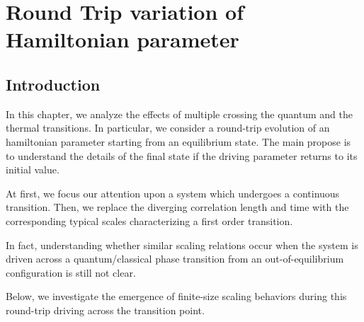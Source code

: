 \chapter{Round Trip variation of Hamiltonian parameter}
\label{chp_round}

\section{Introduction}

In this chapter, we analyze the effects of multiple
crossing the quantum and the thermal transitions. In particular,
we consider a round-trip evolution of an hamiltonian parameter
starting from an equilibrium state. The main propose is to
understand the details of the final state if the driving
parameter returns to its initial value.

At first, we focus our attention upon a system which undergoes
a continuous transition. Then, we replace the diverging correlation
length and time with the corresponding typical scales 
characterizing a first order transition.

In fact,
understanding whether similar scaling relations occur when
the system is driven across a quantum/classical phase transition
from an out-of-equilibrium configuration is still not clear.

Below,
we investigate the emergence of finite-size scaling behaviors
during this round-trip driving across the transition point.






